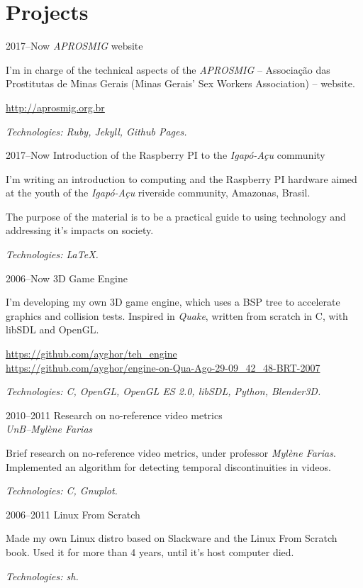 \documentclass[a4paper]{simplecv}
\begin{document}
\section{Projects}

\begin{topic}
\item[2017--Now] \emph{APROSMIG} website

	I'm in charge of the technical aspects of the \emph{APROSMIG} --
	Associação das Prostitutas de Minas Gerais (Minas Gerais' Sex Workers
	Association) -- website.

	{\scriptsize\url{http://aprosmig.org.br}}

	{\em\scriptsize Technologies: Ruby, Jekyll, Github Pages.}

\item[2017--Now] Introduction of the Raspberry PI to the \emph{Igapó-Açu} community

	I'm writing an introduction to computing and the Raspberry PI hardware
	aimed at the youth of the \emph{Igapó-Açu} riverside community,
	Amazonas, Brasil.

	The purpose of the material is to be a practical guide to using
	technology and addressing it's impacts on society.

	{\em\scriptsize Technologies: \LaTeX{}.}

\item[2006--Now] 3D Game Engine

	I'm developing my own 3D game engine, which uses a BSP tree to
	accelerate graphics and collision tests. Inspired in \emph{Quake},
	written from scratch in C, with libSDL and OpenGL.

	{\scriptsize\url{https://github.com/ayghor/teh_engine}}\\
	{\scriptsize\url{https://github.com/ayghor/engine-on-Qua-Ago-29-09\_42\_48-BRT-2007}}

	{\em\scriptsize Technologies: C, OpenGL, OpenGL ES 2.0, libSDL, Python,
	Blender3D.}

\item[2010--2011] Research on no-reference video metrics\\
	{\em\small UnB--Mylène Farias}

	Brief research on no-reference video metrics, under professor
	\emph{Mylène Farias}. Implemented an algorithm for detecting temporal
	discontinuities in videos.

	{\em\scriptsize Technologies: C, Gnuplot.}

\item[2006--2011] Linux From Scratch

	Made my own Linux distro based on Slackware and the Linux From Scratch
	book. Used it for more than 4 years, until it's host computer died.

	{\em\scriptsize Technologies: sh.}

\end{topic}
\end{document}
